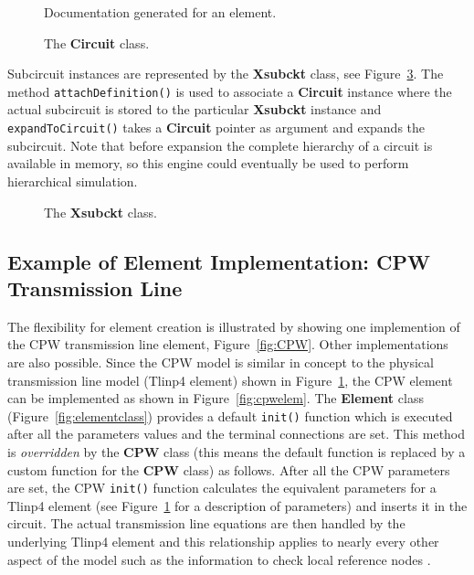 %
\begin{figure}[htpb]
\centerline{\epsfxsize=13cm }
\caption{Documentation generated for an element.} \label{fig:manual}
\end{figure}
%

%
\begin{figure}[htpb]
\centerline{\epsfxsize=6cm }
\caption{The {\bf Circuit} class.} \label{fig:circuitclass}
\end{figure}
%

Subcircuit instances are represented by the {\bf Xsubckt} class, see
Figure~\ref{fig:xsubcktclass}.  The method {\tt attachDefinition()} is
used to associate a {\bf Circuit} instance where the actual subcircuit
is stored to the particular {\bf Xsubckt} instance and {\tt
expandToCircuit()} takes a {\bf Circuit} pointer as argument and
expands the subcircuit.
Note that before expansion the complete hierarchy of a circuit is
available in memory, so this engine could eventually be used to
perform hierarchical simulation.

%
\begin{figure}[htpb]
\centerline{\epsfxsize=6cm }
\caption{The {\bf Xsubckt} class.} \label{fig:xsubcktclass}
\end{figure}
%

\subsection{Example of Element Implementation: CPW Transmission Line}

The flexibility for element creation is illustrated by showing one
implemention of the CPW transmission line element,
Figure~\ref{fig:CPW}. Other implementations are also possible.  Since
the CPW model is similar in concept to the physical transmission line
model (Tlinp4 element) shown in Figure~\ref{fig:manual}, the CPW
element can be implemented as shown in Figure~\ref{fig:cpwelem}. The
{\bf Element} class (Figure~\ref{fig:elementclass}) provides a default
{\tt init()} function which is executed after all the parameters
values and the terminal connections are set. This method is
\emph{overridden} by the {\bf CPW} class (this means the default
function is replaced by a custom function for the {\bf CPW} class) as
follows. After all the CPW parameters are set, the CPW {\tt init()}
function calculates the equivalent parameters for a Tlinp4 element
(see Figure~\ref{fig:manual} for a description of parameters) and
inserts it in the circuit.  The actual transmission line equations are
then handled by the underlying Tlinp4 element and this relationship
applies to nearly every other aspect of the model such as the
information to check local reference nodes
\cite{local:reference:node:christoffersen,local:reference:node:khalil}.

